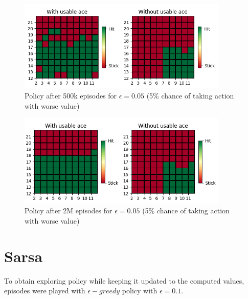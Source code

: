 \documentclass{article}
\begin{document}
\begin{figure}[h]
    \centering
    \includegraphics[width=10cm]{plots/mcopfv_policy_500k.png}
    \caption{Policy after 500k episodes for $\epsilon=0.05$ (5\% chance of taking action with worse value)}
\end{figure}

\begin{figure}[h]
    \centering
    \includegraphics[width=10cm]{plots/mcopfv_policy_2M.png}
    \caption{Policy after 2M episodes for $\epsilon=0.05$ (5\% chance of taking action with worse value)}
\end{figure}

\newpage


\section{Sarsa}
To obtain exploring policy while keeping it updated to the computed values, episodes were played with $\epsilon-greedy$ policy with $\epsilon = 0.1$.
\end{document}
